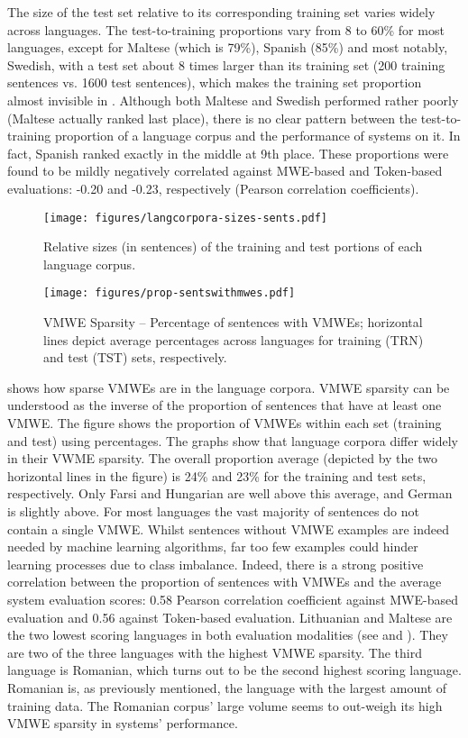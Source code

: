 \documentclass[output=paper
,modfonts
,nonflat,draftmode]{langsci/langscibook}
\begin{document}
The size of the test set relative to its corresponding training set varies widely across languages. The test-to-training proportions vary from 8 to 60\% for most languages, except for Maltese (which is 79\%), Spanish (85\%) and most notably, Swedish, with a test set about 8 times larger than its training set (200 training sentences vs. 1600 test sentences), which makes the training set proportion almost invisible in . Although both Maltese and Swedish performed rather poorly (Maltese actually ranked last place), there is no clear pattern between the test-to-training proportion of a language corpus and the performance of systems on it. In fact, Spanish ranked exactly in the middle at 9th place. These proportions were found to be mildly negatively correlated against MWE-based and Token-based evaluations: -0.20 and -0.23, respectively (Pearson correlation coefficients).

\begin{figure}
\texttt{[image: figures/langcorpora-sizes-sents.pdf]}
\caption{\label{fig:langcorp-sizes} Relative sizes (in sentences) of the training and test portions of each language corpus.}
\end{figure}

\begin{figure}
\texttt{[image: figures/prop-sentswithmwes.pdf]}
\caption{\label{fig:abs-props}VMWE Sparsity -- Percentage of sentences with VMWEs; horizontal lines depict average percentages across languages for training (TRN) and test (TST) sets, respectively.}
\end{figure}

 shows how sparse VMWEs are in the language corpora. VMWE sparsity can be understood as the inverse of the proportion of sentences that have at least one VMWE. The figure shows the proportion of VMWEs within each set (training and test) using percentages. The graphs show that language corpora differ widely in their VWME sparsity. The overall proportion average (depicted by the two horizontal lines in the figure) is 24\% and 23\% for the training and test sets, respectively. Only Farsi and Hungarian are well above this average, and German is slightly above. For most languages the vast majority of sentences do not contain a single VMWE. Whilst sentences without VMWE examples are indeed needed by machine learning algorithms, far too few examples could hinder learning processes due to class imbalance. Indeed, there is a strong positive correlation between the proportion of sentences with VMWEs and the average system evaluation scores: 0.58 Pearson correlation coefficient against MWE-based evaluation and 0.56 against Token-based evaluation. Lithuanian and Maltese are the two lowest scoring languages in both evaluation modalities (see  and ). They are two of the three languages with the highest VMWE sparsity. The third language is Romanian, which turns out to be the second highest scoring language. Romanian is, as previously mentioned, the language with the largest amount of training data. The Romanian corpus' large volume seems to out-weigh its high VMWE sparsity in systems' performance. 
\end{document}
